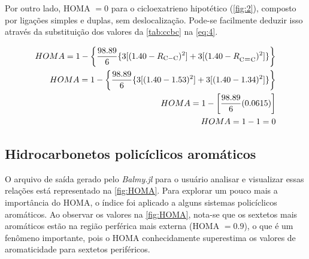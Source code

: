 Por outro lado, \gls{HOMA} $= 0$ para o cicloexatrieno hipotético (\autoref{fig:2}), composto por ligações simples e duplas, sem deslocalização. Pode-se facilmente deduzir isso através da substituição dos valores da \autoref{tab:ccbc} na \autoref{eq:4}.

\begin{equation}
    \begin{split}
        HOMA = 1 - \bigg\{ \frac{98.89}{6} \{ 3[(1.40 - R_{\ce{C-C}})^2] + 3[(1.40 - R_{\ce{C=C}})^2] \} \bigg\} \\
        HOMA = 1 - \bigg\{ \frac{98.89}{6} \{ 3[(1.40 - 1.53)^2] + 3[(1.40 - 1.34)^2] \} \bigg\} \\
        HOMA = 1 - \bigg[ \frac{98.89}{6} (0.0615) \bigg] \\
        HOMA = 1 - 1 = 0
    \end{split}
\end{equation}


\subsection{Hidrocarbonetos policíclicos aromáticos}

O arquivo de saída gerado pelo \textit{Balmy.jl} para o usuário analisar e visualizar essas relações está representado na \autoref{fig:HOMA}. Para explorar um pouco mais a importância do \gls{HOMA}, o índice foi aplicado a alguns sistemas policíclicos aromáticos. Ao observar os valores na \autoref{fig:HOMA}, nota-se que os sextetos mais aromáticos estão na região perférica mais externa (\gls{HOMA} $= 0.9$), o que é um fenômeno importante, pois o \gls{HOMA} conhecidamente superestima os valores de aromaticidade para sextetos periféricos\autocite{giov2020}. 

